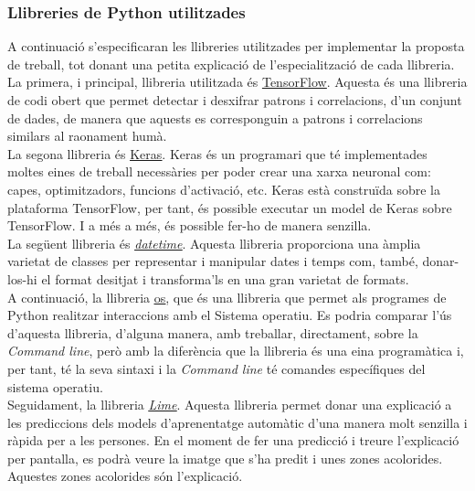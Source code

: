 \documentclass[a4paper,12pt]{article}
\begin{document}
\subsubsection*{Llibreries de Python utilitzades}
A continuació s'especificaran les llibreries utilitzades per implementar la proposta de treball, tot donant una petita explicació de l'especialització de cada llibreria.\\
La primera, i principal, llibreria utilitzada és \href{https://www.tensorflow.org/?hl=es-419}{\underline{TensorFlow}}. Aquesta és una llibreria de codi obert que permet detectar i desxifrar patrons i correlacions, d'un conjunt de dades, de manera que aquests es corresponguin a patrons i correlacions similars al raonament humà.\\
La segona llibreria és \href{https://keras.io}{\underline{Keras}}. Keras és un programari que té implementades moltes eines de treball necessàries per poder crear una xarxa neuronal com: capes, optimitzadors, funcions d'activació, etc. Keras està construïda sobre la plataforma TensorFlow, per tant, és possible executar un model de Keras sobre TensorFlow. I a més a més, és possible fer-ho de manera senzilla.\\
La següent llibreria és \href{https://docs.python.org/3/library/datetime.html}{\underline{\textit{datetime}}}. Aquesta llibreria proporciona una àmplia varietat de classes per representar i manipular dates i temps com, també, donar-los-hi el format desitjat i transforma'ls en una gran varietat de formats.\\
A continuació, la llibreria \href{https://docs.python.org/3/library/os.html}{\underline{os}}, que és una llibreria que permet als programes de Python realitzar interaccions amb el Sistema operatiu. Es podria comparar l'ús d'aquesta llibreria, d'alguna manera, amb treballar, directament, sobre la \textit{Command line}, però amb la diferència que la llibreria és una eina programàtica i, per tant, té la seva sintaxi i la \textit{Command line} té comandes específiques del sistema operatiu.\\
Seguidament, la llibreria \href{https://lime-ml.readthedocs.io/en/latest/}{\underline{\textit{Lime}}}. Aquesta llibreria permet donar una explicació a les prediccions dels models d'aprenentatge automàtic d'una manera molt senzilla i ràpida per a les persones. En el moment de fer una predicció i treure l'explicació per pantalla, es podrà veure la imatge que s'ha predit i unes zones acolorides. Aquestes zones acolorides són l'explicació.\\
\end{document}
